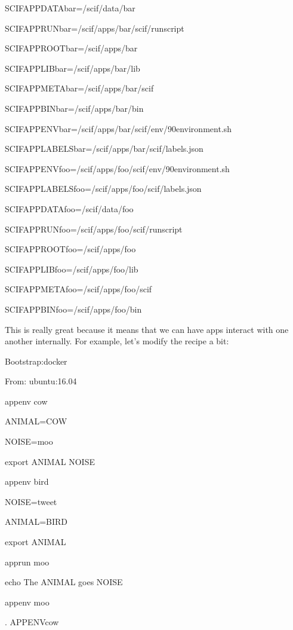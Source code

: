\documentclass[letterpaper,10pt,english]{sphinxmanual}
\begin{document}
%
\begin{sphinxVerbatim}[commandchars=\\\{\}]
SCIF\PYGZus{}APPDATA\PYGZus{}bar=/scif/data/bar

SCIF\PYGZus{}APPRUN\PYGZus{}bar=/scif/apps/bar/scif/runscript

SCIF\PYGZus{}APPROOT\PYGZus{}bar=/scif/apps/bar

SCIF\PYGZus{}APPLIB\PYGZus{}bar=/scif/apps/bar/lib

SCIF\PYGZus{}APPMETA\PYGZus{}bar=/scif/apps/bar/scif

SCIF\PYGZus{}APPBIN\PYGZus{}bar=/scif/apps/bar/bin

SCIF\PYGZus{}APPENV\PYGZus{}bar=/scif/apps/bar/scif/env/90\PYGZhy{}environment.sh

SCIF\PYGZus{}APPLABELS\PYGZus{}bar=/scif/apps/bar/scif/labels.json


SCIF\PYGZus{}APPENV\PYGZus{}foo=/scif/apps/foo/scif/env/90\PYGZhy{}environment.sh

SCIF\PYGZus{}APPLABELS\PYGZus{}foo=/scif/apps/foo/scif/labels.json

SCIF\PYGZus{}APPDATA\PYGZus{}foo=/scif/data/foo

SCIF\PYGZus{}APPRUN\PYGZus{}foo=/scif/apps/foo/scif/runscript

SCIF\PYGZus{}APPROOT\PYGZus{}foo=/scif/apps/foo

SCIF\PYGZus{}APPLIB\PYGZus{}foo=/scif/apps/foo/lib

SCIF\PYGZus{}APPMETA\PYGZus{}foo=/scif/apps/foo/scif

SCIF\PYGZus{}APPBIN\PYGZus{}foo=/scif/apps/foo/bin
\end{sphinxVerbatim}

This is really great because it means that we can have apps interact
with one another internally. For example, let’s modify the recipe a bit:

%
\begin{sphinxVerbatim}[commandchars=\\\{\}]
Bootstrap:docker

From: ubuntu:16.04


\PYGZpc{}appenv cow

    ANIMAL=COW

    NOISE=moo

    export ANIMAL NOISE


\PYGZpc{}appenv bird

    NOISE=tweet

    ANIMAL=BIRD

    export ANIMAL


\PYGZpc{}apprun moo

    echo The \PYGZdl{}\PYGZob{}ANIMAL\PYGZcb{} goes \PYGZdl{}\PYGZob{}NOISE\PYGZcb{}


\PYGZpc{}appenv moo

    . \PYGZdl{}\PYGZob{}APPENV\PYGZus{}cow\PYGZcb{}
\end{sphinxVerbatim}
\end{document}

